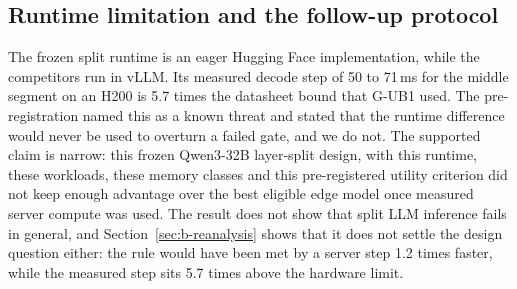\documentclass[lettersize,journal]{IEEEtran}
\begin{document}
\subsection{Runtime limitation and the follow-up protocol}
The frozen split runtime is an eager Hugging Face implementation, while the competitors run in vLLM. Its measured decode step of 50 to 71\,ms for the middle segment on an H200 is 5.7 times the datasheet bound that G-UB1 used. The pre-registration named this as a known threat and stated that the runtime difference would never be used to overturn a failed gate, and we do not. The supported claim is narrow: this frozen Qwen3-32B layer-split design, with this runtime, these workloads, these memory classes and this pre-registered utility criterion did not keep enough advantage over the best eligible edge model once measured server compute was used. The result does not show that split LLM inference fails in general, and Section~\ref{sec:b-reanalysis} shows that it does not settle the design question either: the rule would have been met by a server step 1.2 times faster, while the measured step sits 5.7 times above the hardware limit.
\end{document}
